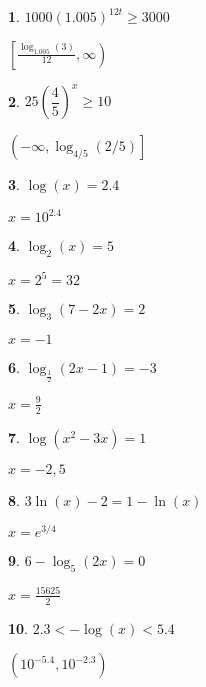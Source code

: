 \documentclass{amsbook}
\newtheorem{exc}{}
\newenvironment{ex}{\begin{exc}\normalfont}{\end{exc}}
\numberwithin{section}{chapter}
\numberwithin{equation}{chapter}
\begin{document}
\begin{multicols}{3}
\begin{ex}
	$1000(1.005)^{12t}\geq3000$
	\begin{sol}
		$\left[\frac{\log_{1.005}(3)}{12},\infty\right)$
	\end{sol}
\end{ex}
\begin{ex}
	$25\left(\dfrac{4}{5}\right)^x\geq 10$
	\begin{sol}
		$\left(-\infty, \log_{4/5}(2/5)\right]$
	\end{sol}
\end{ex}
\begin{ex}
	$\log(x)=2.4$
	\begin{sol}
		$x=10^{2.4}$
	\end{sol}
\end{ex}
\begin{ex}
	$\log_2(x)=5$
	\begin{sol}
		$x=2^5=32$
	\end{sol}
\end{ex}
\begin{ex}
	$\log_3(7-2x)=2$
	\begin{sol}
		$x=-1$
	\end{sol}
\end{ex}
\begin{ex}
	$\log_{\frac{1}{2}}(2x-1)=-3$
	\begin{sol}
		$x=\frac{9}{2}$
	\end{sol}
\end{ex}
%		
\begin{ex}
	$\log(x^2-3x) = 1$
	\begin{sol}
		$x=-2,5$
	\end{sol}
\end{ex}
\begin{ex}
	$3\ln(x)-2 = 1-\ln(x)$
	\begin{sol}
		$x=e^{3/4}$
	\end{sol}
\end{ex}
\begin{ex}
	$6-\log_5(2x) = 0$
	\begin{sol}
		$x=\frac{15625}{2}$
	\end{sol}
\end{ex}
\begin{ex}
	$2.3< -\log(x) < 5.4$
	\begin{sol}
		$\left(  10^{-5.4}, 10^{-2.3} \right)$
	\end{sol}
\end{ex}
\end{multicols}
\end{document}
